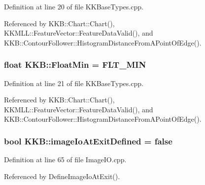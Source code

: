 Definition at line 20 of file K\+K\+Base\+Types.\+cpp.



Referenced by K\+K\+B\+::\+Chart\+::\+Chart(), K\+K\+M\+L\+L\+::\+Feature\+Vector\+::\+Feature\+Data\+Valid(), and K\+K\+B\+::\+Contour\+Follower\+::\+Histogram\+Distance\+From\+A\+Point\+Of\+Edge().

\subsubsection[{\texorpdfstring{Float\+Min}{FloatMin}}]{\setlength{\rightskip}{0pt plus 5cm}float K\+K\+B\+::\+Float\+Min = F\+L\+T\+\_\+\+M\+IN}\hypertarget{namespace_k_k_b_ab02e2be56dc2602d9fe757f5261ebc4c}{}\label{namespace_k_k_b_ab02e2be56dc2602d9fe757f5261ebc4c}


Definition at line 21 of file K\+K\+Base\+Types.\+cpp.



Referenced by K\+K\+B\+::\+Chart\+::\+Chart(), K\+K\+M\+L\+L\+::\+Feature\+Vector\+::\+Feature\+Data\+Valid(), and K\+K\+B\+::\+Contour\+Follower\+::\+Histogram\+Distance\+From\+A\+Point\+Of\+Edge().

\subsubsection[{\texorpdfstring{image\+Io\+At\+Exit\+Defined}{imageIoAtExitDefined}}]{\setlength{\rightskip}{0pt plus 5cm}bool K\+K\+B\+::image\+Io\+At\+Exit\+Defined = false}\hypertarget{namespace_k_k_b_a5623f4480489ffc80054153dff49013d}{}\label{namespace_k_k_b_a5623f4480489ffc80054153dff49013d}


Definition at line 65 of file Image\+I\+O.\+cpp.



Referenced by Define\+Image\+Io\+At\+Exit().

